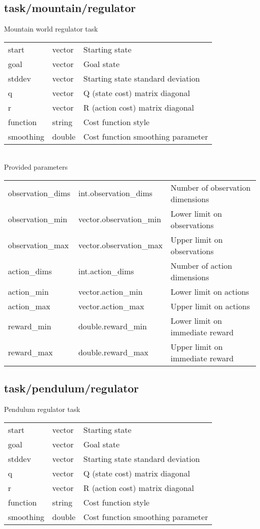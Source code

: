 \subsection{task/mountain/regulator}
\noindent Mountain world regulator task\\

\noindent\begin{tabular}{@{}lll@{}}
start&vector&Starting state\\
goal&vector&Goal state\\
stddev&vector&Starting state standard deviation\\
q&vector&Q (state cost) matrix diagonal\\
r&vector&R (action cost) matrix diagonal\\
function&string&Cost function style\\
smoothing&double&Cost function smoothing parameter\\
\end{tabular}
\\

\noindent Provided parameters\\

\noindent\begin{tabular}{@{}lll@{}}
observation\_dims&int.observation\_dims&Number of observation dimensions\\
observation\_min&vector.observation\_min&Lower limit on observations\\
observation\_max&vector.observation\_max&Upper limit on observations\\
action\_dims&int.action\_dims&Number of action dimensions\\
action\_min&vector.action\_min&Lower limit on actions\\
action\_max&vector.action\_max&Upper limit on actions\\
reward\_min&double.reward\_min&Lower limit on immediate reward\\
reward\_max&double.reward\_max&Upper limit on immediate reward\\
\end{tabular}
\subsection{task/pendulum/regulator}
\noindent Pendulum regulator task\\

\noindent\begin{tabular}{@{}lll@{}}
start&vector&Starting state\\
goal&vector&Goal state\\
stddev&vector&Starting state standard deviation\\
q&vector&Q (state cost) matrix diagonal\\
r&vector&R (action cost) matrix diagonal\\
function&string&Cost function style\\
smoothing&double&Cost function smoothing parameter\\
\end{tabular}
\\

